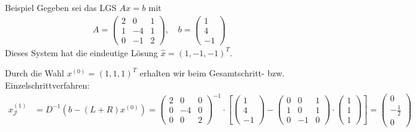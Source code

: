 \begin{colbox}{Beispiel}
  Gegeben sei das LGS $Ax=b$ mit 
  \begin{align*}
    A = \begin{pmatrix}
    2 & 0 & 1 \\ 1 & -4 & 1 \\ 0 & -1 & 2
    \end{pmatrix}, 
    \quad b=\begin{pmatrix}
      1 \\ 4 \\ -1
    \end{pmatrix}
  \end{align*}
  Dieses System hat die eindeutige Lösung $\hat{x} = (1, -1, -1)^T$. 

  Durch die Wahl $x^{(0)}=(1,1,1)^T$ erhalten wir beim Gesamtschritt- bzw. Einzelschrittverfahren:
  \begin{align*}
    x_\mathcal{J}^{(1)} 
    &= D^{-1}(b-(L+R)x^{(0)}) 
    = \begin{pmatrix}
      2 & 0 & 0 \\ 0 & -4 & 0 \\ 0 & 0 & 2
    \end{pmatrix}^{-1} \cdot \left[\begin{pmatrix}
      1 \\ 4 \\ -1
    \end{pmatrix}-\begin{pmatrix}
      0 & 0 & 1 \\ 1 & 0 & 1 \\ 0 & -1 & 0
    \end{pmatrix}\cdot\begin{pmatrix}
      1 \\ 1 \\ 1
    \end{pmatrix}\right] = \begin{pmatrix}
      0 \\ -\tfrac{1}{2} \\ 0
    \end{pmatrix} \\

\end{align*}
\end{colbox}

